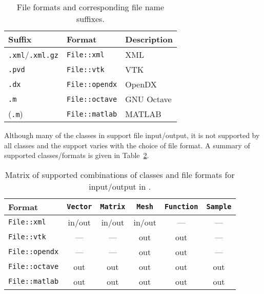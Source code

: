 \begin{table}[htbp]
  \begin{center}
    \begin{tabular}{|l|l|l|}
      \hline
      Suffix & Format & Description \\
      \hline
      \hline
      \texttt{.xml}/\texttt{.xml.gz} & \texttt{File::xml} & \dolfin{} XML \\
      \hline
      \texttt{.pvd} & \texttt{File::vtk} & VTK \\
      \hline
      \texttt{.dx} & \texttt{File::opendx} & OpenDX \\
      \hline
      \texttt{.m} & \texttt{File::octave} & GNU Octave \\
      \hline
      (\texttt{.m}) & \texttt{File::matlab} & MATLAB \\
      \hline
    \end{tabular}
    \caption{File formats and corresponding file name suffixes.}
    \label{tab:formats}
  \end{center}
\end{table}

Although many of the classes in \dolfin{} support file input/output,
it is not supported by all classes and the support varies with the
choice of file format. A summary of supported classes/formats is
given in Table~\ref{tab:classes,formats}.


\begin{table}[htbp]
  \begin{center}
    \begin{tabular}{|l||c|c|c|c|c|}
      \hline
      Format           & \texttt{Vector} & \texttt{Matrix} & \texttt{Mesh} & \texttt{Function} & \texttt{Sample} \\
      \hline
      \hline
      \texttt{File::xml}     & in/out & in/out & in/out & --- & --- \\
      \hline
      \texttt{File::vtk}     & ---    & ---    & out    & out & --- \\
      \hline
      \texttt{File::opendx}  & ---    & ---    & out    & out & --- \\
      \hline
      \texttt{File::octave}  & out    & out    & out    & out & out \\
      \hline
      \texttt{File::matlab}  & out    & out    & out    & out & out \\
      \hline
    \end{tabular}
    \caption{Matrix of supported combinations of classes and file
      formats for input/output in \dolfin{}.}
    \label{tab:classes,formats}
  \end{center}
\end{table}

